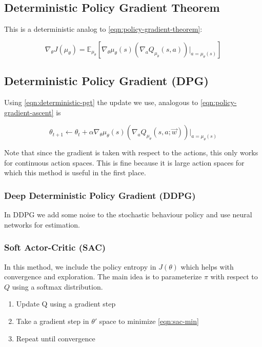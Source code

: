 \documentclass[11pt]{report}
\begin{document}
\subsection{Deterministic Policy Gradient Theorem}
This is a deterministic analog to \autoref{eqn:policy-gradient-theorem}:

\begin{equation}
	\label{eqn:deterministic-pgt}
	\nabla_\theta J(\mu_\theta) = \mathbb{E}_{\mu_\theta} \left[ \nabla_\theta \mu_\theta(s) \left(\nabla_a Q_{\mu_\theta}(s, a)\right)\rvert_{a = \mu_\theta(s)}\right]
\end{equation}

\subsection{Deterministic Policy Gradient (DPG)}
Using \autoref{eqn:deterministic-pgt} the update we use, analogous to \autoref{eqn:policy-gradient-ascent} is

\begin{equation}
	\label{eqn:dpg-update}
	\theta_{t+1} \xleftarrow{} \theta_{t} + \alpha \nabla_\theta \mu_\theta(s) \left(\nabla_a Q_{\mu_\theta}(s, a; \vec{w})\right)\rvert_{a = \mu_\theta(s)}
\end{equation}

Note that since the gradient is taken with respect to the actions, this only works for continuous action spaces. This is fine because it is large action spaces for which this method is useful in the first place.

\subsubsection{Deep Deterministic Policy Gradient (DDPG)}
In DDPG we add some noise to the stochastic behaviour policy and use neural networks for estimation.

\subsubsection{Soft Actor-Critic (SAC)}
In this method, we include the policy entropy in $J(\theta)$ which helps with convergence and exploration. The main idea is to parameterize $\pi$ with respect to $Q$ using a softmax distribution.

\begin{enumerate}
	\item Update Q using a gradient step
	\item Take a gradient step in $\theta'$ space to minimize \autoref{eqn:sac-min}
	\item Repeat until convergence
\end{enumerate}
\end{document}
